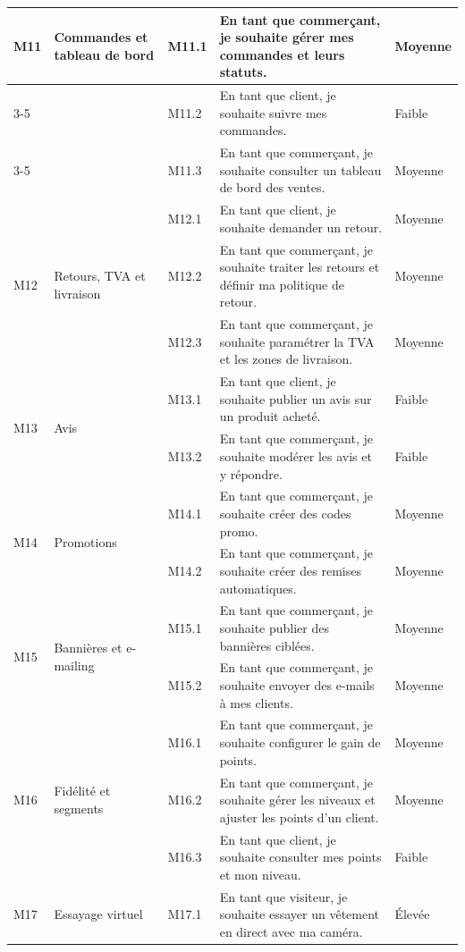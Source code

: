 \begin{longtable}{|p{0.9cm}|p{3cm}|p{1.3cm}|p{6.6cm}|p{1.9cm}|}
\hline
\multirow{3}{*}{M11} & \multirow{3}{3cm}{Commandes et tableau de bord} & M11.1 & En tant que commerçant, je souhaite gérer mes commandes et leurs statuts. & Moyenne \\
\cline{3-5}
 & & M11.2 & En tant que client, je souhaite suivre mes commandes. & Faible \\
\cline{3-5}
 & & M11.3 & En tant que commerçant, je souhaite consulter un tableau de bord des ventes. & Moyenne \\
\hline
\multirow{3}{*}{M12} & \multirow{3}{3cm}{Retours, TVA et livraison} & M12.1 & En tant que client, je souhaite demander un retour. & Moyenne \\
\cline{3-5}
 & & M12.2 & En tant que commerçant, je souhaite traiter les retours et définir ma politique de retour. & Moyenne \\
\cline{3-5}
 & & M12.3 & En tant que commerçant, je souhaite paramétrer la TVA et les zones de livraison. & Moyenne \\
\hline
\multirow{2}{*}{M13} & \multirow{2}{3cm}{Avis} & M13.1 & En tant que client, je souhaite publier un avis sur un produit acheté. & Faible \\
\cline{3-5}
 & & M13.2 & En tant que commerçant, je souhaite modérer les avis et y répondre. & Faible \\
\hline
\multirow{2}{*}{M14} & \multirow{2}{3cm}{Promotions} & M14.1 & En tant que commerçant, je souhaite créer des codes promo. & Moyenne \\
\cline{3-5}
 & & M14.2 & En tant que commerçant, je souhaite créer des remises automatiques. & Moyenne \\
\hline
\multirow{2}{*}{M15} & \multirow{2}{3cm}{Bannières et e-mailing} & M15.1 & En tant que commerçant, je souhaite publier des bannières ciblées. & Moyenne \\
\cline{3-5}
 & & M15.2 & En tant que commerçant, je souhaite envoyer des e-mails à mes clients. & Moyenne \\
\hline
\multirow{3}{*}{M16} & \multirow{3}{3cm}{Fidélité et segments} & M16.1 & En tant que commerçant, je souhaite configurer le gain de points. & Moyenne \\
\cline{3-5}
 & & M16.2 & En tant que commerçant, je souhaite gérer les niveaux et ajuster les points d'un client. & Moyenne \\
\cline{3-5}
 & & M16.3 & En tant que client, je souhaite consulter mes points et mon niveau. & Faible \\
\hline
\multirow{2}{*}{M17} & \multirow{2}{3cm}{Essayage virtuel} & M17.1 & En tant que visiteur, je souhaite essayer un vêtement en direct avec ma caméra. & Élevée \\

\end{longtable}
